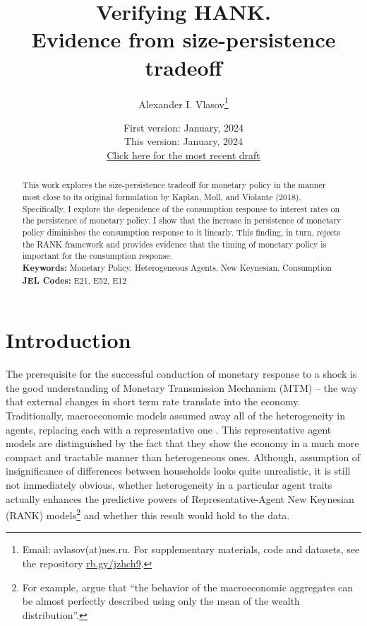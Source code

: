 \documentclass[12pt]{article}
\title{Verifying HANK.\\ Evidence from size-persistence tradeoff}
\author{Alexander I. Vlasov\thanks{Email: avlasov(at)nes.ru. For supplementary materials, code and datasets, see the repository \href{https://rb.gy/jzhch9}{rb.gy/jzhch9}.}}
\date{\normalsize First version: January, 2024\\\vspace{1ex} This version: January, 2024\\ \vspace{1ex}
\href{https://github.com/alvlsv/CheckingHank/blob/6906f23fcb1a16aa4fc9997532f52c1659e9c29f/Checking_HANK/Paper/CheckingHANK.pdf}{Click here for the most recent draft}}
\numberwithin{equation}{section}
\begin{document}
\maketitle



\begin{abstract}
    \noindent This work explores the size-persistence tradeoff for monetary policy in the manner most close to its original formulation by Kaplan, Moll, and Violante (2018). Specifically, I explore the dependence of the consumption response to interest rates on the persistence of monetary policy. I show that the increase in persistence of monetary policy diminishes the consumption response to it linearly. This finding, in turn, rejects the RANK framework and provides evidence that the timing of monetary policy is important for the consumption response.
    \\
    \noindent\textbf{Keywords:} Monetary Policy, Heterogeneous Agents, New Keynesian, Consumption
    \\
    \noindent\textbf{JEL Codes:} E21, E52, E12 \\
    \bigskip
\end{abstract}

\section{Introduction}

The prerequisite for the successful conduction of monetary response to a shock is the good understanding of Monetary Transmission Mechanism (MTM) -- the way that external changes in short term rate translate into the economy. 
Traditionally, macroeconomic models assumed away all of the heterogeneity in agents, replacing each with a representative one \cite{Gali2018}.
This representative agent models are distinguished by the fact that they show the economy in a much more compact and tractable manner than heterogeneous ones.
Although, assumption of insignificance of differences between households looks quite unrealistic, it is still not immediately obvious, whether heterogeneity in a particular agent traits actually enhances the predictive powers of Representative-Agent New Keynesian (RANK) models\footnote{For example, \citet{Krusell1998} argue that  ``the behavior of the macroeconomic aggregates can be almost perfectly described using only the mean of the wealth distribution''.} 
and whether this result would hold to the data.
\end{document}

